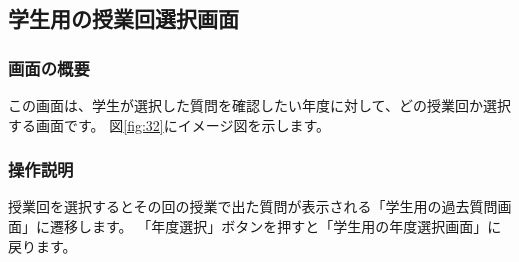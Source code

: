 \newpage

\subsection{学生用の授業回選択画面}
\subsubsection{画面の概要}
この画面は、学生が選択した質問を確認したい年度に対して、どの授業回か選択する画面です。
図\ref{fig:32}にイメージ図を示します。

\subsubsection{操作説明}
授業回を選択するとその回の授業で出た質問が表示される「学生用の過去質問画面」に遷移します。
「年度選択」ボタンを押すと「学生用の年度選択画面」に戻ります。



